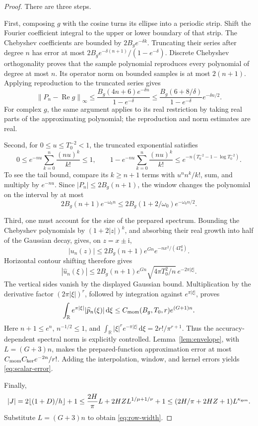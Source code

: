 \documentclass[11pt,letterpaper]{article}
\newcommand{\R}{\mathbb R}
\newcommand{\dd}{\,\mathrm d}
\newcommand{\ii}{\mathrm i}
\newcommand{\norm}[1]{\left\lVert#1\right\rVert}
\theoremstyle{definition}
\theoremstyle{remark}
\begin{document}
\begin{proof}
There are three steps.

First, composing \(g\) with the cosine turns its ellipse into a periodic
strip. Shift the Fourier coefficient integral to the upper or lower boundary
of that strip. The Chebyshev coefficients are bounded by \(2B_ge^{-\delta k}\).
Truncating their series after degree \(n\) has error at most
\(2B_ge^{-\delta(n+1)}/(1-e^{-\delta})\).
Discrete Chebyshev orthogonality proves that the sample polynomial reproduces
every polynomial of degree at most \(n\). Its operator norm on bounded samples
is at most \(2(n+1)\). Applying reproduction to the truncated series gives
\[
 \norm{P_n-\operatorname{Re}g}_\infty
 \le\frac{B_g(4n+6)e^{-\delta n}}{1-e^{-\delta}}
 \le\frac{B_g(6+8/\delta)}{1-e^{-\delta}}e^{-\delta n/2}.
\]
For complex \(g\), the same argument applies to its real restriction by
taking real parts of the approximating polynomial; the reproduction and
norm estimates are real.

Second, for \(0\le u\le T_0^{-2}<1\), the truncated exponential satisfies
\[
 0\le e^{-nu}\sum_{k=0}^{n}\frac{(nu)^k}{k!}\le1,\qquad
 1-e^{-nu}\sum_{k=0}^{n}\frac{(nu)^k}{k!}
 \le e^{-n(T_0^{-2}-1-\log T_0^{-2})}.
\]
To see the tail bound, compare its \(k\ge n+1\) terms with
\(u^n n^k/k!\), sum, and multiply by \(e^{-nu}\).
Since \(|P_n|\le2B_g(n+1)\), the window changes the polynomial on the interval
by at most
\[
 2B_g(n+1)e^{-\omega_0n}
 \le2B_g(1+2/\omega_0)e^{-\omega_0n/2}.
\]

Third, one must account for the size of the prepared spectrum.
Bounding the Chebyshev polynomials by \((1+2|z|)^k\), and absorbing their real
growth into half of the Gaussian decay, gives, on \(z=x\pm\ii\),
\[
 |u_n(z)|\le2B_g(n+1)e^{Gn}
                      e^{-nx^2/(4T_0^2)}.
\]
Horizontal contour shifting therefore gives
\[
 |\widehat u_n(\xi)|
 \le2B_g(n+1)e^{Gn}\sqrt{4\pi T_0^2/n}\,e^{-2\pi|\xi|}.
\]
The vertical sides vanish by the displayed Gaussian bound.
Multiplication by the derivative factor \((2\pi|\xi|)^r\), followed by
integration against \(e^{\pi|\xi|}\), proves
\[
 \int_\R e^{\pi|\xi|}|\widehat p_n(\xi)|\dd\xi
 \le C_{\rm mom}(B_g,T_0,r)e^{(G+1)n}.
\]
Here \(n+1\le e^n\), \(n^{-1/2}\le1\), and
\(\int_\R|\xi|^re^{-\pi|\xi|}\dd\xi=2r!/\pi^{r+1}\).
Thus the accuracy-dependent spectral norm is explicitly controlled.
Lemma~\ref{lem:envelope}, with \(L=(G+3)n\), makes the prepared-function
approximation error at most
\(C_{\rm mom}C_{\rm ker}e^{-2n}/r!\).
Adding the interpolation, window, and kernel errors yields \eqref{eq:scalar-error}.

Finally,
\[
 |J|=2\lfloor(1+D)/h\rfloor+1
 \le \frac{2H}{\pi}L+2HZL^{1/\mu+1/\nu}+1
 \le(2H/\pi+2HZ+1)L^{\kappa_{\rm gen}}.
\]
Substitute \(L=(G+3)n\) to obtain \eqref{eq:row-width}.
\end{proof}
\end{document}
